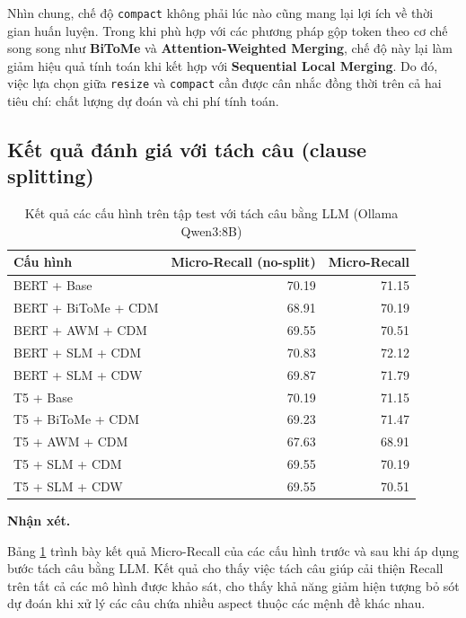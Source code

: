 Nhìn chung, chế độ \texttt{compact} không phải lúc nào cũng mang lại
lợi ích về thời gian huấn luyện. Trong khi phù hợp với các phương pháp
gộp token theo cơ chế song song như \textbf{BiToMe} và
\textbf{Attention-Weighted Merging}, chế độ này lại làm giảm hiệu quả tính toán
khi kết hợp với \textbf{Sequential Local Merging}. Do đó, việc lựa chọn giữa
\texttt{resize} và \texttt{compact} cần được cân nhắc đồng thời trên cả
hai tiêu chí: chất lượng dự đoán và chi phí tính toán.




\subsection{Kết quả đánh giá với tách câu (clause splitting)}
\label{subsec:clause_split}

\begin{table}[H]
\centering
\caption{Kết quả các cấu hình trên tập test với tách câu bằng LLM (Ollama Qwen3:8B)}
\label{tab:t5_split}
\small
\begin{tabular}{@{}lrr@{}}
\toprule
\textbf{Cấu hình} & \textbf{Micro-Recall (no-split)} & \textbf{Micro-Recall} \\
\midrule
BERT + Base           & 70.19 & 71.15 \\
BERT + BiToMe + CDM   & 68.91 & 70.19 \\
BERT + AWM + CDM      & 69.55 & 70.51 \\
BERT + SLM + CDM      & 70.83 & 72.12 \\
BERT + SLM + CDW      & 69.87 & 71.79 \\
\midrule
T5 + Base             & 70.19 & 71.15 \\
T5 + BiToMe + CDM     & 69.23 & 71.47 \\
T5 + AWM + CDM        & 67.63 & 68.91 \\
T5 + SLM + CDM        & 69.55 & 70.19 \\
T5 + SLM + CDW        & 69.55 & 70.51 \\
\bottomrule
\end{tabular}
\end{table}

\textbf{Nhận xét.}

Bảng \ref{tab:t5_split} trình bày kết quả Micro-Recall của các cấu hình trước và sau khi áp dụng bước tách câu bằng LLM. Kết quả cho thấy việc tách câu giúp cải thiện Recall trên tất cả các mô hình được khảo sát, cho thấy khả năng giảm hiện tượng bỏ sót dự đoán khi xử lý các câu chứa nhiều aspect thuộc các mệnh đề khác nhau.

